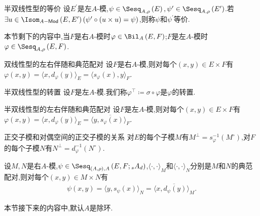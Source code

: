 \begin{definition}{半双线性型的等价}{}
	设$E^{\prime}$是左$A$-模,$\psi\in\Sesq_{A,\rho}\left(E\right),\psi^{\prime}\in\Sesq_{A,\rho}\left(E^{\prime}\right)$.若$\exists u\in\Isom_{A-\mathsf{Mod}}\left(E,E^{\prime}\right)\left(\psi^{\prime}\circ\left(u\times u\right)=\psi\right)$,则称$\psi$和$\psi^{\prime}$等价.
\end{definition}

本节剩下的内容中,当$F$是右$A$-模时$\varphi\in\Bil_{A}\left(E,F\right)$;$F$是左$A$-模时$\varphi\in\Sesq_{A,\rho}\left(E,F\right)$.

\begin{proposition}{双线性型的左右伴随和典范配对}{}
	设$F$是右$A$-模,则对每个$\left(x,y\right)\in E\times F$有$\varphi\left(x,y\right)=\langle x,d_{\varphi}\left(y\right)\rangle_{E}=\langle s_{\varphi}\left(x\right),y\rangle_{F}$.
\end{proposition}

\begin{definition}{半双线性型的转置}{}
	设$F$是左$A$-模.我们称$\varphi^{\top}\coloneq\sigma\circ\varphi$是$\varphi$的转置.
\end{definition}

\begin{proposition}{半双线性型的左右伴随和典范配对}{}
	设$F$是左$A$-模,则对每个$\left(x,y\right)\in E\times F$有$\varphi\left(x,y\right)=\langle x,d_{\varphi}\left(y\right)\rangle_{E}=\overline{\langle y,s_{\varphi}\left(x\right)\rangle_{F}}$.
\end{proposition}

\begin{proposition}{正交子模和对偶空间的正交子模的关系}{}
	对$E$的每个子模$M$有$M^{\perp}=s_{\varphi}^{-1}\left(M^{\circ}\right)$,对$F$的每个子模$N$有$N^{\perp}=d_{\varphi}^{-1}\left(N^{\circ}\right)$.
\end{proposition}

\begin{remark}{}{}
	设$M,N$是右$A$-模,$\psi\in\Sesq_{(A,\rho),A}\left(E,F;{}_{s}A_{d}\right)$,$\langle\cdot,\cdot\rangle_{M}$和$\langle\cdot,\cdot\rangle_{N}$分别是$M$和$N$的典范配对,则对每个$\left(x,y\right)\in M\times N$有
	\begin{align*}
		\psi\left(x,y\right)=\langle y,s_{\psi}\left(x\right)\rangle_{N}=\overline{\langle x,d_{\psi}\left(y\right)\rangle_{M}}.
	\end{align*}
\end{remark}

本节接下来的内容中,默认$A$是除环.

